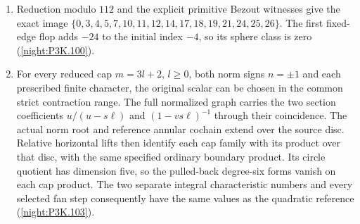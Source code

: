 \begin{enumerate}[label=\arabic*.]
  The derivative clutch gives $V_{00}=27$ and $\delta_0=-21$;
  the actual selected-disc products give the same seed on every
  vertical fan. Euclidean fan descent and the unique target-prism
  solution then telescope to the displayed polynomial
  (\cref{night:P3K.100}).
\item Reduction modulo $112$ and the explicit primitive Bezout
  witnesses give the exact image
  $\{0,3,4,5,7,10,11,12,14,17,18,19,21,24,25,26\}$.
  The first fixed-edge flop adds $-24$ to the initial index $-4$,
  so its sphere class is zero (\cref{night:P3K.100}).
\item For every reduced cap $m=3l+2$, $l\geq0$, both norm signs
  $n=\pm1$ and each prescribed finite character, the original scalar
  can be chosen in the common strict contraction range. The full
  normalized graph carries the two section coefficients
  $u/(u-s\ell)$ and $(1-vs\ell)^{-1}$ through their coincidence.
  The actual norm root and reference annular cochain extend over
  the source disc. Relative horizontal lifts then identify each cap
  family with its product over that disc, with the same specified
  ordinary boundary product. Its circle quotient has dimension
  five, so the pulled-back degree-six forms vanish on each cap
  product. The two separate integral characteristic numbers and
  every selected fan step consequently have the same values as the
  quadratic reference (\cref{night:P3K.103}).
\end{enumerate}

